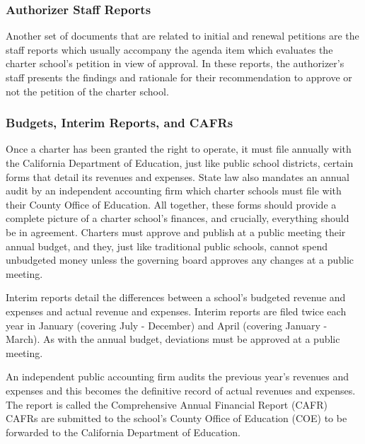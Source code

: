 \subsubsection{Authorizer Staff Reports}\label{sec:cs-staff-reports}\indent%

Another set of documents that are related to initial and renewal petitions are the staff reports which usually accompany the agenda item which evaluates the charter school's petition in view of approval. In these reports, the authorizer's staff presents the findings and rationale for their recommendation to approve or not the petition of the charter school.

\subsubsection{Budgets,  Interim Reports, and CAFRs}\label{sec:budgets-etc}\indent%

Once a charter has been granted the right to operate, it must file annually with the California Department of Education, just like public school districts, certain forms that detail its revenues and expenses. State law also mandates an annual audit by an independent accounting firm which charter schools must file with their County Office of Education. All together, these forms should provide a complete picture of a charter school's finances, and crucially, everything should be in agreement. Charters must approve and publish at a public meeting their annual budget, and they, just like traditional public schools, cannot spend unbudgeted money unless the governing board approves any changes at a public meeting.

Interim reports detail the differences between a school's budgeted revenue and expenses and actual revenue and expenses. Interim reports are filed twice each year in January (covering July - December) and April (covering January - March). As with the annual budget, deviations must be approved at a public meeting.

An independent public accounting firm audits the previous year's revenues and expenses and this becomes the definitive record of actual revenues and expenses. The report is called the Comprehensive Annual Financial Report (CAFR)  CAFRs are submitted to the school's County Office of Education (COE) to be forwarded to the California Department of Education.

